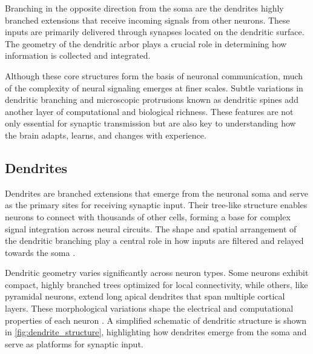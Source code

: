 Branching in the opposite direction from the soma are the dendrites highly branched extensions that receive incoming signals from other neurons. These inputs are primarily delivered through synapses located on the dendritic surface. The geometry of the dendritic arbor plays a crucial role in determining how information is collected and integrated.

Although these core structures form the basis of neuronal communication, much of the complexity of neural signaling emerges at finer scales. Subtle variations in dendritic branching and microscopic protrusions known as dendritic spines add another layer of computational and biological richness. These features are not only essential for synaptic transmission but are also key to understanding how the brain adapts, learns, and changes with experience.

\subsection{Dendrites}
Dendrites are branched extensions that emerge from the neuronal soma and serve as the primary sites for receiving synaptic input. Their tree-like structure enables neurons to connect with thousands of other cells, forming a base for complex signal integration across neural circuits. The shape and spatial arrangement of the dendritic branching play a central role in how inputs are filtered and relayed towards the soma \cite{Peng_2015}.

Dendritic geometry varies significantly across neuron types. Some neurons exhibit compact, highly branched trees optimized for local connectivity, while others, like pyramidal neurons, extend long apical dendrites that span multiple cortical layers. These morphological variations shape the electrical and computational properties of each neuron \cite{Yuste_2001}. A simplified schematic of dendritic structure is shown in \autoref{fig:dendrite_structure}, highlighting how dendrites emerge from the soma and serve as platforms for synaptic input.

